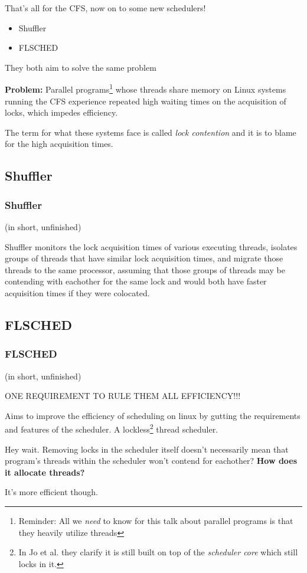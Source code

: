 \documentclass{beamer}
\newcommand{\linespace}{\vskip 0.25cm}
\begin{document}
\begin{frame}
That's all for the CFS, now on to some new schedulers!

\linespace

\begin{itemize}
\item Shuffler
\item FLSCHED
\end{itemize}

\linespace

They both aim to solve the same problem

\linespace
\textbf{Problem:} Parallel programs\footnote{Reminder: All we \emph{need} to know for this talk about parallel programs is that they heavily utilize threads} whose threads share memory on Linux systems running the CFS experience repeated high waiting times on the acquisition of locks, which impedes efficiency.

\linespace

\linespace

The term for what these systems face is called \emph{lock contention} and it is to blame for the high acquisition times.
\end{frame}

\subsection{Shuffler}
\begin{frame}
\frametitle{Shuffler}

(in short, unfinished)

Shuffler monitors the lock acquisition times of various executing threads, isolates groups of threads that have similar lock acquisition times, and migrate those threads to the same processor, assuming that those groups of threads may be contending with eachother for the same lock and would both have faster acquisition times if they were colocated.

\end{frame}

\subsection{FLSCHED}
\begin{frame}
\frametitle{FLSCHED}

(in short, unfinished)

ONE REQUIREMENT TO RULE THEM ALL
EFFICIENCY!!!

\linespace

Aims to improve the efficiency of scheduling on linux by gutting the requirements and features of the scheduler.
A lockless\footnote{In Jo et al. they clarify it is still built on top of the \emph{scheduler core} which still locks in it.} thread scheduler.

\linespace

Hey wait. Removing locks in the scheduler itself doesn't necessarily mean that program's threads within the scheduler won't contend for eachother? \textbf{How does it allocate threads?}

It's more efficient though.


\end{frame}
\end{document}
